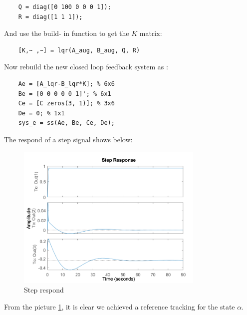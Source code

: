 \begin{lstlisting}
    Q = diag([0 100 0 0 0 1]);
    R = diag([1 1 1]);       
\end{lstlisting}

And use the build- in function to get the $ K $ matrix:

\begin{lstlisting}
    [K,~ ,~] = lqr(A_aug, B_aug, Q, R)
\end{lstlisting}

Now rebuild the new closed loop feedback system as :

\begin{lstlisting}
    Ae = [A_lqr-B_lqr*K]; % 6x6
    Be = [0 0 0 0 0 1]'; % 6x1
    Ce = [C zeros(3, 1)]; % 3x6
    De = 0; % 1x1
    sys_e = ss(Ae, Be, Ce, De);
\end{lstlisting}

The respond of a step signal shows below:

\begin{figure}[H]
 \centering
 \includegraphics[width=0.8\textwidth]{images/step.png}
 \caption{Step respond}
 \label{step}
\end{figure}

From the picture \ref{step}, it is clear we achieved a reference tracking for the state $ \alpha $.

  
